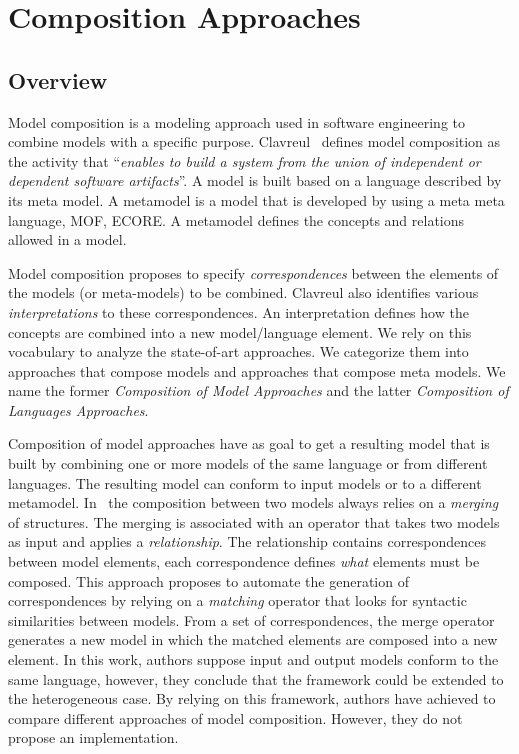 \section{Composition Approaches}
\subsection{Overview}
Model composition is a modeling approach used in software engineering to combine models with a specific purpose. Clavreul~\cite{clavreulmodelcompo} defines model composition as the activity that ``\textit{enables to build a system from the union of independent or dependent software artifacts}''. A model is built based on a language described by its meta model. A metamodel is a model that is developed by using a meta meta language, \eg MOF, ECORE. A metamodel defines the concepts and relations allowed in a model.

Model composition proposes to specify \emph{correspondences} between the elements of the models (or meta-models) to be combined. Clavreul also identifies various \emph{interpretations} to these correspondences. An interpretation defines how the concepts are combined into a new model/language element. We rely on this vocabulary to analyze the state-of-art approaches. We categorize them into approaches that compose models and approaches that compose meta models. We name the former \emph{Composition of Model Approaches} and the latter \emph{Composition of Languages Approaches}.    

Composition of model approaches have as goal to get a resulting model that is built by combining one or more models of the same language or from different languages. The resulting model can conform to input models or to a different metamodel. In~\cite{mergemanifest} the composition between two models always relies on a \emph{merging} of structures. The merging is associated with an operator that takes two models as input and applies a \emph{relationship}. The relationship contains correspondences between model elements, each correspondence defines \emph{what} elements must be composed. This approach proposes to automate the generation of correspondences by relying on a \emph{matching} operator that looks for syntactic similarities between models. From a set of correspondences, the merge operator generates a new model in which the matched elements are composed into a new element. In this work, authors suppose input and output models conform to the same language, however, they conclude that the framework could be extended to the heterogeneous case. By relying on this framework, authors have achieved to compare different approaches of model composition. However, they do not propose an implementation. 

